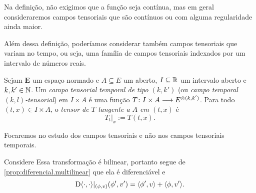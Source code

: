 Na definição, não exigimos que a função seja contínua, mas em geral consideraremos campos tensoriais que são contínuos ou com alguma regularidade ainda maior.


Além dessa definição, poderíamos considerar também campos tensoriais que variam no tempo, ou seja, uma família de campos tensoriais indexados por um intervalo de números reais.

\begin{definition}
	Sejam $\bm E$ um espaço normado e $A \subseteq E$ um aberto, $I \subseteq \mathbb{R}$ um intervalo aberto e $k,k' \in \mathbb{N}$. Um \emph{campo tensorial temporal de tipo $(k,k')$} (ou \emph{campo temporal $(k,l)$-tensorial}) em $I \times A$ é uma função $T\colon \allowbreak I \times A \longrightarrow E^{\otimes(k,k')}$. Para todo $(t,x) \in I \times A$, o \emph{tensor de $T$ tangente a $A$ em $(t,x)$} é
	\begin{equation*}
		T_t|_x := T(t,x).
	\end{equation*}
\end{definition}

Focaremos no estudo dos campos tensoriais e não nos campos tensoriais temporais.

Considere 
Essa transformação é bilinear, portanto segue de \ref{prop:diferencial.multilinear} que ela é diferenciável e
	\begin{equation*}
	\mathrm{D} \langle \cdot, \cdot \rangle|_{(\phi,v)}(\phi',v') = \langle \phi', v \rangle + \langle \phi, v' \rangle.
	\end{equation*}

